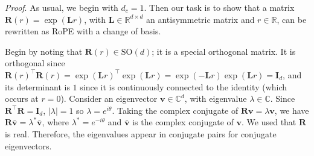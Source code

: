 \emph{Proof}. 
As usual, we begin with $d_c=1$.
Then our task is to show that a matrix $\mathbf{R}(r) = \exp(\mathbf{L}r)$, with $\mathbf{L} \in \mathbb{R}^{d \times d}$ an antisymmetric matrix and $r \in \mathbb{R}$, can be rewritten as RoPE with a change of basis.

Begin by noting that $\mathbf{R}(r) \in \textrm{SO}(d)$; it is a special orthogonal matrix.
It is orthogonal since $\mathbf{R}(r)^\top\mathbf{R}(r) = \exp(\mathbf{L}r)^\top \exp(\mathbf{L}r) = \exp(-\mathbf{L}r) \exp(\mathbf{L}r) = \mathbf{I}_d$, and its determinant is $1$ since it is continuously connected to the identity (which occurs at $r=0$).
Consider an eigenvector $\mathbf{v} \in \mathbb{C}^d$, with eigenvalue $\lambda \in \mathbb{C}$.
Since $\mathbf{R}^\top \mathbf{R} = \mathbf{I}_d$, $|\lambda|=1$ so $\lambda = e^{i \theta}$. 
Taking the complex conjugate of $\mathbf{R}\mathbf{v}=\lambda \mathbf{v}$, we have $\mathbf{R}\bar{\mathbf{v}}=\lambda^* \bar{\mathbf{v}}$, where $\lambda^* = e^{-i \theta}$ and $\bar{\mathbf{v}}$ is the complex conjugate of $\mathbf{v}$. 
We used that $\mathbf{R}$ is real.
Therefore, the eigenvalues appear in conjugate pairs for conjugate eigenvectors.


